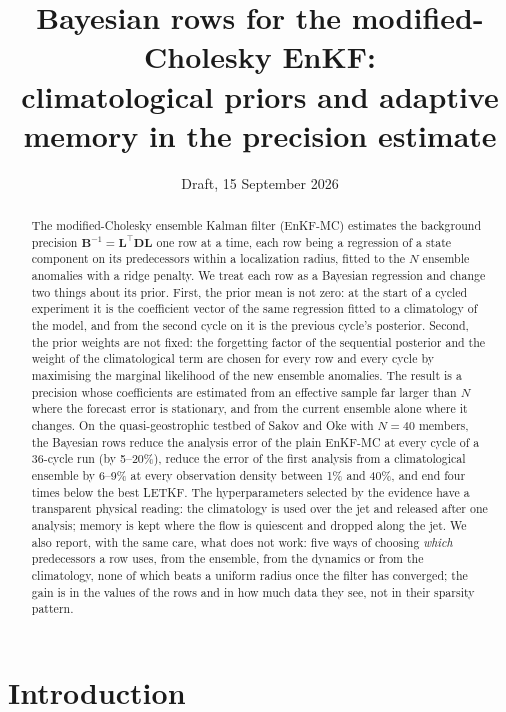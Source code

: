 \documentclass[11pt]{article}
\title{Bayesian rows for the modified-Cholesky EnKF:\\ climatological priors and adaptive memory in the precision estimate}
\author{}
\date{Draft, 15 September 2026}
\newcommand{\B}{\mathbf{B}}
\newcommand{\Lm}{\mathbf{L}}
\newcommand{\Dm}{\mathbf{D}}
\begin{document}
\maketitle

\begin{abstract}
The modified-Cholesky ensemble Kalman filter (EnKF-MC) estimates the background
precision $\B^{-1}=\Lm^\top\Dm\Lm$ one row at a time, each row being a regression of a
state component on its predecessors within a localization radius, fitted to the $N$
ensemble anomalies with a ridge penalty. We treat each row as a Bayesian regression and
change two things about its prior. First, the prior mean is not zero: at the start of a
cycled experiment it is the coefficient vector of the same regression fitted to a
climatology of the model, and from the second cycle on it is the previous cycle's
posterior. Second, the prior weights are not fixed: the forgetting factor of the
sequential posterior and the weight of the climatological term are chosen for every row
and every cycle by maximising the marginal likelihood of the new ensemble anomalies.
The result is a precision whose coefficients are estimated from an effective sample far
larger than $N$ where the forecast error is stationary, and from the current ensemble
alone where it changes. On the quasi-geostrophic testbed of Sakov and Oke with $N=40$
members, the Bayesian rows reduce the analysis error of the plain EnKF-MC at every
cycle of a 36-cycle run (by 5--20\%), reduce the error of the first analysis from a
climatological ensemble by 6--9\% at every observation density between 1\% and 40\%,
and end four times below the best LETKF. The hyperparameters selected by the evidence
have a transparent physical reading: the climatology is used over the jet and released
after one analysis; memory is kept where the flow is quiescent and dropped along the
jet. We also report, with the same care, what does not work: five ways of choosing
\emph{which} predecessors a row uses, from the ensemble, from the dynamics or from the
climatology, none of which beats a uniform radius once the filter has converged; the
gain is in the values of the rows and in how much data they see, not in their sparsity
pattern.
\end{abstract}

\section{Introduction}
\end{document}
